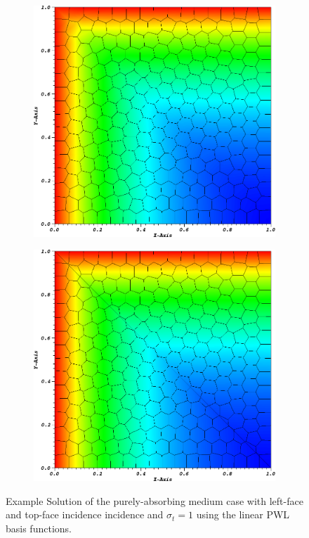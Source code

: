 \begin{figure}
{\begin{subfigure}[b]{0.485\textwidth}
	\end{subfigure}
}
\vspace{1cm}
{
	\begin{subfigure}[b]{0.485\textwidth}
		\centering
		\label{subfig::PA_Mesh_Poly}
		\includegraphics[width=\textwidth]{figures/sec_BF/PALeftTopSol_Poly.png}
	\end{subfigure}
	\hfill
	\begin{subfigure}[b]{0.485\textwidth}
		\centering
		\label{subfig::PA_Mesh_SplitPoly}
		\includegraphics[width=\textwidth]{figures/sec_BF/PALeftTopSol_SplitPoly.png}
	\end{subfigure}
}
\caption{Example Solution of the purely-absorbing medium case with left-face and top-face incidence incidence and $\sigma_t=1$ using the linear PWL basis functions.}
\label{fig::BF_Results_PA_LeftTop_Solutions}
\end{figure}

